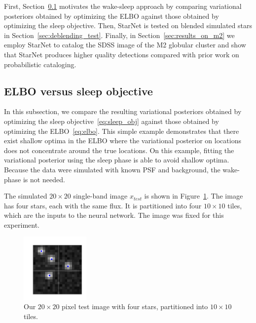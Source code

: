 
First, Section~\ref{sec:estep_sleep_compare} motivates the wake-sleep approach by comparing variational posteriors obtained by optimizing the ELBO against those obtained by optimizing the sleep objective. 
Then, StarNet is tested on blended simulated stars in Section~\ref{sec:deblending_test}. 
Finally, in Section~\ref{sec:results_on_m2} we employ StarNet to catalog the SDSS image of the M2 globular cluster and show that StarNet produces higher quality detections compared with prior work on probabilistic cataloging. 


\subsection{ELBO versus sleep objective}
\label{sec:estep_sleep_compare}

In this subsection, we compare the resulting variational posteriors obtained by optimizing the sleep objective~\eqref{eq:sleep_obj} 
against those obtained by optimizing the ELBO~\eqref{eq:elbo}.
This simple example demonstrates that there exist shallow optima in the ELBO where the variational posterior on locations does not concentrate around the true locations.
On this example, fitting the variational posterior using the sleep phase is able to avoid shallow optima. 
Because the data were simulated with known PSF and background, the wake-phase is not needed. 

The simulated $20\times20$ single-band image $x_{test}$ is shown in Figure~\ref{fig:toy_example}.
The image has four stars, each with the same flux. It is partitioned into four $10\times 10$ tiles, which are the inputs to the neural network. 
The image was fixed for this experiment. 

\begin{figure}[!h]
    \centering
    \vspace{-1em}
    \includegraphics[width = 0.3\textwidth]{figures/vi_sleep_ex_figure.png}
    \vspace{-1.7em}
    \caption{Our $20\times 20$ pixel test image with four stars, partitioned into $10\times 10$ tiles. }
    \label{fig:toy_example}
\end{figure}

